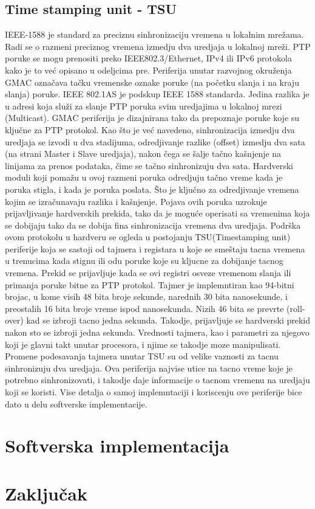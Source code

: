 \documentclass[a4paper,12pt, master]{etf}
\begin{document}
	\section{Time stamping unit - TSU}
	IEEE-1588 je standard za preciznu sinhronizaciju vremena u lokalnim mre\v{z}ama. Radi se o 
	razmeni	preciznog vremena izmedju dva uredjaja u lokalnoj mre\v{z}i. PTP poruke se mogu 
	prenositi preko	IEEE802.3/Ethernet, IPv4 ili IPv6 protokola kako je to ve\'{c} opisano u 
	odeljcima pre. Periferija unutar razvojnog okru\v{z}enja GMAC ozna\v{c}ava ta\v{c}ku 
	vremenske oznake poruke (na po\v{c}etku slanja i na kraju slanja) poruke. IEEE 802.1AS je 
	podskup IEEE 1588 standarda. Jedina razlika je u adresi koja slu\v{z}i za slanje PTP poruka 
	svim uredjajima u lokalnoj mrezi (Multicast). GMAC periferija je dizajnirana tako da 
	prepoznaje poruke koje su klju\v{c}ne za PTP protokol. Kao \v{s}to je ve\'{c} navedeno, 
	sinhronizacija izmedju dva uredjaja se izvodi u dva stadijuma, odredjivanje razlike	(offset) 
	izmedju dva sata (na strani Master i Slave uredjaja), nakon \v{c}ega se \v{s}alje ta\v{c}no	
	ka\v{s}njenje na linijama za prenos podataka, \v{c}ime se ta\v{c}no sinhronizuju dva sata. 
	Hardverski moduli koji poma\v{z}u u ovoj razmeni poruka odredjuju ta\v{c}no vreme kada je 
	poruka stigla, i kada je poruka poslata. \v{S}to je klju\v{c}no za odredjivanje vremena 
	kojim se izra\v{c}unavaju razlika i ka\v{s}njenje. Pojava ovih poruka uzrokuje 
	prijavljivanje hardverskih prekida, tako da je mogu\'{c}e operisati sa vremenima koja se 
	dobijaju tako da se dobija fina sinhronizacija vremena dva uredjaja. Podr\v{s}ka ovom 
	protokolu u hardveru se ogleda u postojanju TSU(Timestamping unit) periferije 
	koja se sastoji od tajmera i registara u koje se sme\v{s}taju tacna vremena u trenucima kada 
	stignu ili odu poruke koje su kljucne za dobijanje tacnog vremena. Prekid se prijavljuje 
	kada se ovi	registri osveze vremenom slanja ili primanja poruke bitne za PTP protokol.
	Tajmer je implemntiran kao 94-bitni brojac, u kome visih 48 bita broje sekunde, narednih 30
	bita nanosekunde, i preostalih 16 bita broje vreme ispod nanosekunda. Nizih 46 bita se 
	prevrte	(roll-over) kad se izbroji tacno jedna sekunda. Takodje, prijavljuje se hardverski 
	prekid nakon sto se izbroji jedna sekunda. Vrednosti tajmera, kao i parametri za njegovo 
	koji je glavni takt	unutar procesora, i njime se takodje moze manipulisati.
	Promene podesavanja tajmera unutar TSU su od velike vaznosti za tacnu sinhronizuju dva
	uredjaja. Ova periferija najvise utice na tacno vreme koje je potrebno sinhronizovati, i
	takodje daje informacije o tacnom vremenu na uredjaju koji se koristi. Vise detalja o samoj
	implemntaciji i koriscenju ove periferije bice dato u delu softverske implementacije.

	\newpage

	\chapter{Softverska implementacija}

	\newpage

	\chapter{Zaključak}

	\newpage
\end{document}
